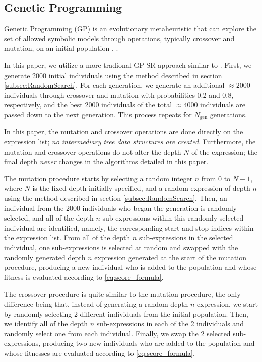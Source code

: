 \documentclass[runningheads]{llncs}
\begin{document}
\subsection{Genetic Programming} \label{subsec:GeneticProgramming}
Genetic Programming (GP) is an evolutionary metaheuristic that can explore the set of allowed symbolic models through operations, typically crossover and mutation, on an initial population \cite{manti2023discovering} \cite{PoliFieldGuideGP}, \cite{Koza1994}.
\par In this paper, we utilize a more tradional GP SR approach similar to \cite{manti2023discovering}. First, we generate 2000 initial individuals using the method described in section \ref{subsec:RandomSearch}. For each generation, we generate an additional $\approx 2000$ individuals through crossover and mutation with probabilities 0.2 and 0.8, respectively, and the best 2000 individuals of the total $\approx 4000$ individuals are passed down to the next generation. This process repeats for $N_{\mathrm{gen}}$ generations.
\par In this paper, the mutation and crossover operations are done directly on the expression list; \emph{no intermediary tree data structures are created}. Furthermore, the mutation and crossover operations do not alter the depth $N$ of the expression; the final depth \emph{never} changes in the algorithms detailed in this paper. 
\par The mutation procedure starts by selecting a random integer $n$ from $0$ to $N-1$, where $N$ is the fixed depth initially specified, and a random expression of depth $n$ using the method described in section \ref{subsec:RandomSearch}. Then, an individual from the 2000 individuals who began the generation is randomly selected, and all of the depth $n$ sub-expressions within this randomly selected individual are identified, namely, the corresponding start and stop indices within the expression list. From all of the depth $n$ sub-expressions in the selected individual, one sub-expressions is selected at random and swapped with the randomly generated depth $n$ expression generated at the start of the mutation procedure, producing a new individual who is added to the population and whose fitness is evaluated according to \ref{eq:score_formula}.
\par The crossover procedure is quite similar to the mutation procedure, the only difference being that, instead of generating a random depth $n$ expression, we start by randomly selecting 2 different individuals from the initial population. Then, we identify all of the depth $n$ sub-expressions in each of the 2 individuals and randomly select one from each individual. Finally, we swap the 2 selected sub-expressions, producing two new individuals who are added to the population and whose fitnesses are evaluated according to \ref{eq:score_formula}.
\end{document}
